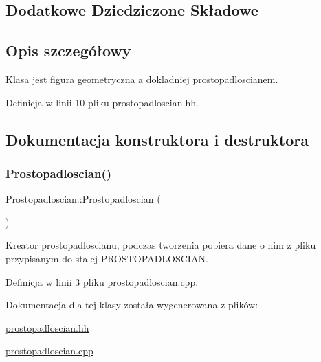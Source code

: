 \subsection*{Dodatkowe Dziedziczone Składowe}


\subsection{Opis szczegółowy}
Klasa jest figura geometryczna a dokladniej prostopadloscianem. 

Definicja w linii 10 pliku prostopadloscian.\+hh.



\subsection{Dokumentacja konstruktora i destruktora}
\mbox{\label{class_prostopadloscian_a432b8df2af37ba1a3596f500824eaffe}} 
\subsubsection{\texorpdfstring{Prostopadloscian()}{Prostopadloscian()}}
{\footnotesize\ttfamily Prostopadloscian\+::\+Prostopadloscian (\begin{DoxyParamCaption}{ }\end{DoxyParamCaption})}

Kreator prostopadloscianu, podczas tworzenia pobiera dane o nim z pliku przypisanym do stalej P\+R\+O\+S\+T\+O\+P\+A\+D\+L\+O\+S\+C\+I\+AN. 

Definicja w linii 3 pliku prostopadloscian.\+cpp.



Dokumentacja dla tej klasy została wygenerowana z plików\+:\begin{DoxyCompactItemize}
\item 
\mbox{\hyperlink{prostopadloscian_8hh}{prostopadloscian.\+hh}}\item 
\mbox{\hyperlink{prostopadloscian_8cpp}{prostopadloscian.\+cpp}}\end{DoxyCompactItemize}
